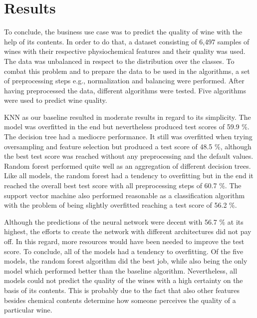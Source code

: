\chapter{Results}
To conclude, the business use case was to predict the quality of wine with the help of its contents. In order to do that, a dataset consisting of 6,497 samples of wines with their respective physiochemical features and their quality was used. The data was unbalanced in respect to the distribution over the classes. To combat this problem and to prepare the data to be used in the algorithms, a set of preprocessing steps e.g., normalization and balancing were performed. After having preprocessed the data, different algorithms were tested. Five algorithms were used to predict wine quality. 

KNN as our baseline resulted in moderate results in regard to its simplicity. The model was overfitted in the end but nevertheless produced test scores of 59.9 \%. The decision tree had a mediocre performance. It still was overfitted when trying oversampling and feature selection but produced a test score of 48.5 \%, although the best test score was reached without any preprocessing and the default values. Random forest performed quite well as an aggregation of different decision trees. Like all models, the random forest had a tendency to overfitting but in the end it reached the overall best test score with all preprocessing steps of 60.7 \%. The support vector machine also performed reasonable as a classification algorithm with the problem of being slightly overfitted reaching a test score of 56.2 \%.

Although the predictions of the neural network were decent with 56.7 \% at its highest, the efforts to create the network with different architectures did not pay off. In this regard, more resources would have been needed to improve the test score. To conclude, all of the models had a tendency to overfitting.
Of the five models, the random forest algorithm did the best job, while also being the only model which performed better than the baseline algorithm.
Nevertheless, all models could not predict the quality of the wines with a high certainty on the basis of its contents. This is probably due to the fact that also other features besides chemical contents determine how someone perceives the quality of a particular wine.